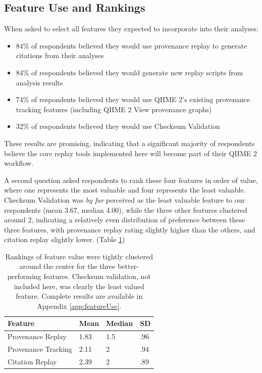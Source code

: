 \subsection{Feature Use and Rankings}

When asked to select all features they expected to incorporate into their
analyses:

\begin{itemize}
    \item 84\% of respondents believed they would use provenance replay to
        generate citations from their analyses
    \item 84\% of respondents believed they would generate new replay scripts from analysis results
    \item 74\% of respondents believed they would use QIIME 2’s existing
        provenance tracking features (including QIIME 2 View provenance graphs)
    \item 32\% of respondents believed they would use Checksum Validation
\end{itemize}

These results are promising, indicating that a significant majority of
respondents believe the core replay tools implemented here will become part of
their QIIME 2 workflow.

A second question asked respondents to rank these four features in order of
value, where one represents the most valuable and four represents the least
valuable. Checksum Validation was \textit{by far} perceived as the least valuable feature
to our respondents (mean 3.67, median 4.00), while the three other features
clustered around 2, indicating a relatively even distribution of preference
between these three features, with provenance replay rating slightly higher than
the others, and citation replay slightly lower. (Table \ref{tab:feature_rankings})


\begin{table}[htp]
    \centering
    \begin{tabular}{|p{}|p{}|p{}|p{}|}
    \hline
    Feature             & Mean & Median & SD  \\ \hline
    Provenance Replay   & 1.83 & 1.5    & .96 \\
    Provenance Tracking & 2.11 & 2      & .94 \\
    Citation Replay     & 2.39 & 2      & .89 \\ \hline
    \end{tabular}
    \caption[Respondent rankings of feature value]%
    {Rankings of feature value were tightly clustered around the center for the
    three better-performing features. Checksum validation, not included here,
    was clearly the least valued feature. Complete results are available in
    Appendix \ref{app:featureUse}.}
    \label{tab:feature_rankings}
\end{table}

